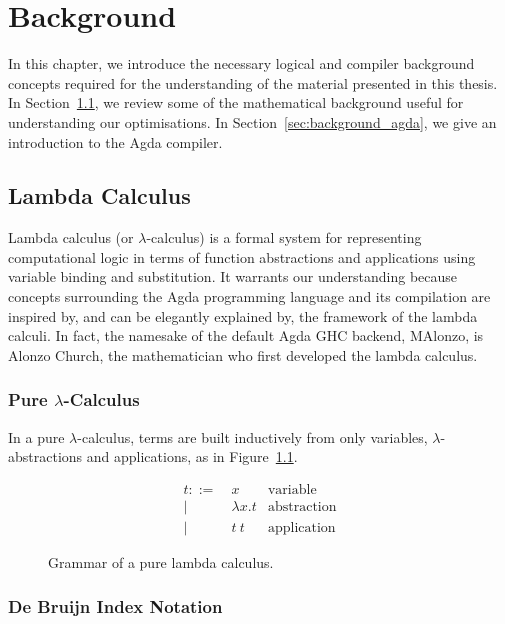 \chapter{Background}
\label{cha:background}

In this chapter, we introduce the necessary logical and compiler background concepts required for the understanding of the material presented in this thesis. In Section~\ref{sec:lambda_calc}, we review some of the mathematical background useful for understanding our optimisations. In Section~\ref{sec:background_agda}, we give an introduction to the Agda compiler.

\section{Lambda Calculus}
\label{sec:lambda_calc}

Lambda calculus (or $\lambda$-calculus) is a formal system for representing computational logic in terms of function abstractions and applications using variable binding and substitution. It warrants our understanding because concepts surrounding the Agda programming language and its compilation are inspired by, and can be elegantly explained by, the framework of the lambda calculi.\citep{fokkinga1987} In fact, the namesake of the default Agda GHC backend, MAlonzo, is Alonzo Church, the mathematician who first developed the lambda calculus.\citep{fokkinga1987}

\subsection{Pure $\lambda$-Calculus}

In a pure $\lambda$-calculus, terms are built inductively from only variables, $\lambda$-abstractions and applications, as in Figure~\ref{fig:lambda_calc}.\citep{kozen1997}

\begin{figure}[h]
\begin{align*}
t ::=~& x               & \text{variable}\\
    |~& \lambda x . t   & \text{abstraction}\\
    |~& t~t             & \text{application}
\end{align*}
\caption{Grammar of a pure lambda calculus.}
\label{fig:lambda_calc}
\end{figure}

\subsection{De Bruijn Index Notation}

